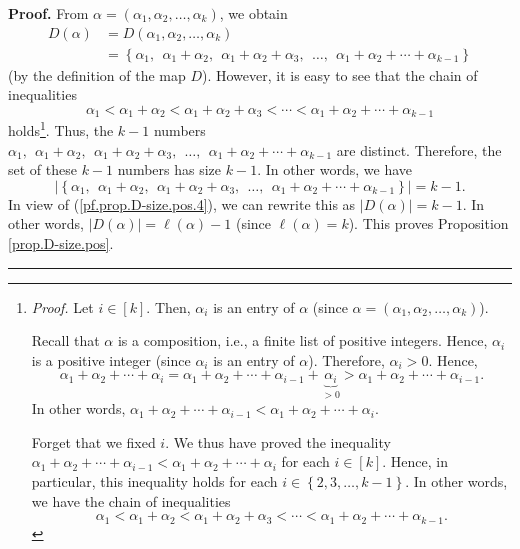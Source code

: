 \documentclass[numbers=enddot,12pt,final,onecolumn,notitlepage]{scrartcl}%
\theoremstyle{definition}
\newenvironment{proof}[1][Proof]{\noindent\textbf{#1.} }{\ \rule{0.5em}{0.5em}}
\begin{document}
\begin{proof}
From $\alpha=\left(  \alpha_{1},\alpha_{2},\ldots,\alpha_{k}\right)  $, we
obtain%
\begin{align}
D\left(  \alpha\right)   &  =D\left(  \alpha_{1},\alpha_{2},\ldots,\alpha
_{k}\right) \nonumber\\
&  =\left\{  \alpha_{1},\ \ \alpha_{1}+\alpha_{2},\ \ \alpha_{1}+\alpha
_{2}+\alpha_{3},\ \ \ldots,\ \ \alpha_{1}+\alpha_{2}+\cdots+\alpha
_{k-1}\right\}  \label{pf.prop.D-size.pos.4}%
\end{align}
(by the definition of the map $D$). However, it is easy to see that the chain
of inequalities
\[
\alpha_{1}<\alpha_{1}+\alpha_{2}<\alpha_{1}+\alpha_{2}+\alpha_{3}%
<\cdots<\alpha_{1}+\alpha_{2}+\cdots+\alpha_{k-1}%
\]
holds\footnote{\textit{Proof.} Let $i\in\left[  k\right]  $. Then, $\alpha
_{i}$ is an entry of $\alpha$ (since $\alpha=\left(  \alpha_{1},\alpha
_{2},\ldots,\alpha_{k}\right)  $).
\par
Recall that $\alpha$ is a composition, i.e., a finite list of positive
integers. Hence, $\alpha_{i}$ is a positive integer (since $\alpha_{i}$ is an
entry of $\alpha$). Therefore, $\alpha_{i}>0$. Hence,%
\[
\alpha_{1}+\alpha_{2}+\cdots+\alpha_{i}=\alpha_{1}+\alpha_{2}+\cdots
+\alpha_{i-1}+\underbrace{\alpha_{i}}_{>0}>\alpha_{1}+\alpha_{2}+\cdots
+\alpha_{i-1}.
\]
In other words, $\alpha_{1}+\alpha_{2}+\cdots+\alpha_{i-1}<\alpha_{1}%
+\alpha_{2}+\cdots+\alpha_{i}$.
\par
Forget that we fixed $i$. We thus have proved the inequality $\alpha
_{1}+\alpha_{2}+\cdots+\alpha_{i-1}<\alpha_{1}+\alpha_{2}+\cdots+\alpha_{i}$
for each $i\in\left[  k\right]  $. Hence, in particular, this inequality holds
for each $i\in\left\{  2,3,\ldots,k-1\right\}  $. In other words, we have the
chain of inequalities
\[
\alpha_{1}<\alpha_{1}+\alpha_{2}<\alpha_{1}+\alpha_{2}+\alpha_{3}%
<\cdots<\alpha_{1}+\alpha_{2}+\cdots+\alpha_{k-1}.
\]
}. Thus, the $k-1$ numbers $\alpha_{1},\ \ \alpha_{1}+\alpha_{2}%
,\ \ \alpha_{1}+\alpha_{2}+\alpha_{3},\ \ \ldots,\ \ \alpha_{1}+\alpha
_{2}+\cdots+\alpha_{k-1}$ are distinct. Therefore, the set of these $k-1$
numbers has size $k-1$. In other words, we have
\[
\left\vert \left\{  \alpha_{1},\ \ \alpha_{1}+\alpha_{2},\ \ \alpha_{1}%
+\alpha_{2}+\alpha_{3},\ \ \ldots,\ \ \alpha_{1}+\alpha_{2}+\cdots
+\alpha_{k-1}\right\}  \right\vert =k-1.
\]
In view of (\ref{pf.prop.D-size.pos.4}), we can rewrite this as $\left\vert
D\left(  \alpha\right)  \right\vert =k-1$. In other words, $\left\vert
D\left(  \alpha\right)  \right\vert =\ell\left(  \alpha\right)  -1$ (since
$\ell\left(  \alpha\right)  =k$). This proves Proposition
\ref{prop.D-size.pos}.
\end{proof}
\end{document}
